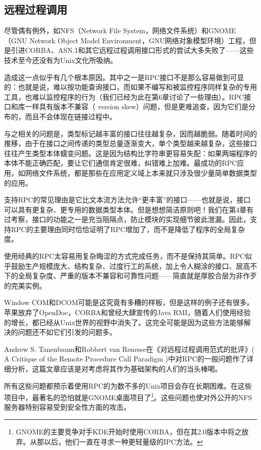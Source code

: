 \documentclass[12pt,oneside]{book}
\begin{document}
\begin{common-format}
\subsection{远程过程调用}
尽管偶有例外，如NFS（Network File System，网络文件系统）和GNOME （GNU Network Object Model Environment，GNU网络对象模型环境）工程，但是引进CORBA、ASN.1和其它远程过程调用接口形式的尝试大多失败了——这些技术至今还没有为Unix文化所吸纳。

造成这一点似乎有几个根本原因。其中之一是RPC接口不是那么容易做到可显的：也就是说，难以按功能查询接口，而如果不编写和被监控程序同样复杂的专用工具，也难以监控程序的行为（我们已经为此在第6章讨论了一些理由）。RPC接口和库一样具有版本不兼容（ version skew）问题，但是更难追查，因为它们是分布的，而且不会体现在链接过程中。

与之相关的问题是，类型标记越丰富的接口往往越复杂，因而越脆弱。随着时间的推移，由于在接口之间传递的类型总量逐渐变大，单个类型越来越复杂，这些接口往往产生类型本体蠕变问题。这是因为结构比字符串更容易失配：如果两端程序的本体不能正确匹配，要让它们通信肯定很难，纠错难上加难。最成功的RPC应用，如网络文件系统，都是那些在应用定义域上本来就只涉及很少量简单数据类型的应用。

支持RPC的常见理由是它比文本流方法允许“更丰富”的接口——也就是说，接口可以具有更复杂、更专用的数据类型本体。但是想想简洁原则吧！我们在第4章有过考察，接口的功能之一是充当阻隔点，防止模块的实现细节彼此泄漏。因此，支持RPC的主要理由同时恰恰证明了RPC增加了，而不是降低了程序的全局复杂度。

使用经典的RPC太容易用复杂晦涩的方式完成任务，而不是保持其简单。RPC似乎鼓励生产规模庞大、结构复杂、过度行工的系统，加上令人糊涂的接口、居高不下的全局复杂度、严重的版本不兼容和可靠性问题——简直就是厚胶合层为非作歹的完美实例。

Window COM和DCOM可能是这究竟有多糟的样板，但是这样的例子还有很多。苹果放弃了OpenDoc，CORBA和曾经大肆宣传的Java RMI，随着人们使用经验的增长，都已经从Unix世界的视野中消失了。这完全可能是因为这些方法能够解决的问题还不如它们引发的问题多。

Andrew S. Tanenbaum和Robbert van Renesse在《对远程过程调用范式的批评》( A Critique of the Remote Procedure Call Paradigm \cite{Tanenbaum-VanRenesse} )中对RPC的一般问题作了详细分析，这篇文章应该是对考虑将其作为基础架构的人们的当头棒喝。

所有这些问题都预示着使用RPC的为数不多的Unix项目会存在长期困难。在这些项目中，最著名的恐怕就是GNOME桌面项目了\footnote{GNOME的主要竞争对手KDE开始时使用CORBA，但在其2.0版本中将之放弃。从那以后，他们一直在寻求一种更轻量级的IPC方法。}。这些问题也使对外公开的NFS服务器特别容易受到安全性方面的攻击。


\end{common-format}
\end{document}
